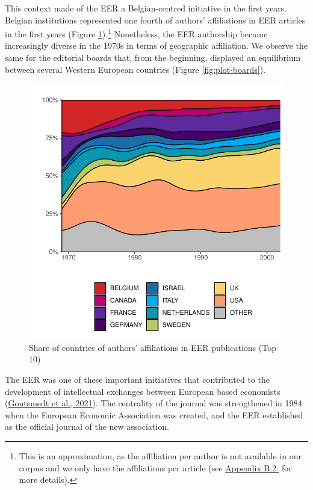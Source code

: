\documentclass[]{elsarticle} %
\begin{document}
This context made of the EER a Belgian-centred initiative in the first
years. Belgian institutions represented one fourth of authors'
affiliations in EER articles in the first years (Figure
\ref{fig:plot-authors}).\footnote{This is an approximation, as the
  affiliation per author is not available in our corpus and we only have
  the affiliations per article (see
  \protect\hyperlink{author-affiliation}{Appendix B.2.} for more
  details).} Nonetheless, the EER authorship became increasingly diverse
in the 1970s in terms of geographic affiliation. We observe the same for
the editorial boards that, from the beginning, displayed an equilibrium
between several Western European countries (Figure
\ref{fig:plot-boards}).

\begin{figure}[h]

{\centering \includegraphics{First_version_files/figure-latex/plot-authors-1} 

}

\caption{Share of countries of authors' affiliations in EER publications (Top 10)}\label{fig:plot-authors}
\end{figure}

The EER was one of these important initiatives that contributed to the
development of intellectual exchanges between European based economists
(\protect\hyperlink{ref-goutsmedt2021}{Goutsmedt et al., 2021}). The
centrality of the journal was strengthened in 1984 when the European
Economic Association was created, and the EER established as the
official journal of the new association.
\end{document}
